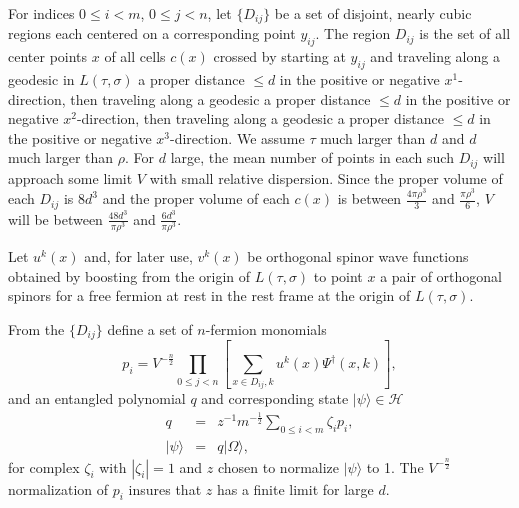 \documentclass[12pt,amsmath,amssymb,onecolumn]{revtex4-2}
\begin{document}
For indices $0 \leq i < m $, $0 \leq j < n$, let $\{ D_{ij} \}$ be a set of 
disjoint, nearly cubic regions each centered on a
corresponding point $y_{ij}$. 
The region $D_{ij}$ is the set of all center points $x$ of all cells $c(x)$
crossed by starting at $y_{ij}$ and traveling along a geodesic in $L(\tau, \sigma)$
a proper distance $\le d$ in the positive or negative $x^1$-direction,
then traveling along a geodesic a proper distance $\le d$ in the positive or negative $x^2$-direction,
then traveling along a geodesic a proper distance $\le d$ in the positive or negative $x^3$-direction.
We assume $\tau$ much larger than $d$ and $d$ much larger than $\rho$.
For $d$ large, the mean number of points in each such $D_{ij}$ will approach some limit $V$
with small relative dispersion. Since the proper volume of each $D_{ij}$ is $8 d^3$ and the
proper volume of each $c(x)$ is between $\frac{4 \pi \rho^3}{3}$ and $\frac{\pi \rho^3}{6}$, $V$
will be between $\frac{48 d^3}{\pi \rho^3}$ and $\frac{ 6 d^3}{\pi \rho^3}$.


Let $u^k(x)$ and, for later use, $v^k(x)$ be orthogonal
spinor wave functions obtained by boosting from
the origin of $L(\tau, \sigma)$ to point $x$
a pair of orthogonal spinors for
a free fermion at rest in the rest frame at the origin of $L(\tau, \sigma)$.

From the $\{ D_{ij} \}$ define a set of $n$-fermion monomials
\begin{equation}
\label{pstatesr}
p_i =  
V^{-\frac{n}{2}}\prod_{0 \le j <n} \left[\sum_{x \in D_{ij},k} u^k(x) \Psi^\dagger( x,k )\right], 
\end{equation}
and an entangled polynomial $q$ and corresponding state $|\psi \rangle  \in \mathcal{H}$
\begin{subequations}
\begin{eqnarray}
\label{entangledstater}
q &=& z^{-1} m^{-\frac{1}{2}}\sum_{0 \le i < m} \zeta_i p_i, \\
\label{entangledstater1}
|\psi \rangle  & = & q|\Omega \rangle ,
\end{eqnarray}
\end{subequations}
for complex $\zeta_i$ with $| \zeta_i| = 1$ and $z$ chosen to normalize $|\psi \rangle $ to 1.
The $V^{-\frac{n}{2}}$ normalization of $p_i$ insures that $z$ has a finite limit for large $d$.
\end{document}
